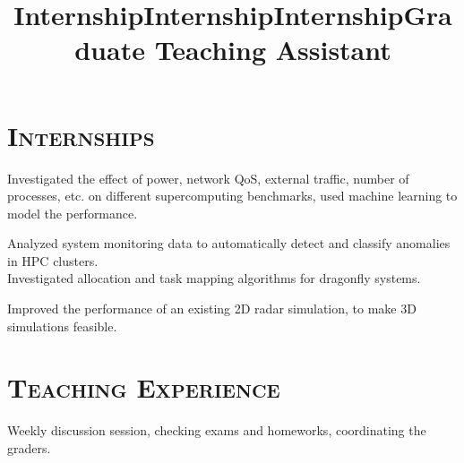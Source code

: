 \begin{resume}
	\section{\textsc{Internships}}
	
	\title{Internship}
	\begin{position}
    Investigated the effect of power, network QoS, external traffic, number of
    processes, etc. on different supercomputing benchmarks, used machine
    learning to model the performance.
	\end{position}
	
	\title{Internship}
	\begin{position}
		Analyzed system monitoring data to automatically detect and classify
    anomalies in HPC clusters. \\
    Investigated allocation and task mapping algorithms for dragonfly systems.
	\end{position}
	
	\title{Internship}
	\begin{position}
		Improved the performance of an existing 2D radar simulation, to make 3D
    simulations feasible.
	\end{position}
	
	
	\section{\textsc{Teaching Experience}}
	
	\title{Graduate Teaching Assistant}
	\begin{position}
		Weekly discussion session, checking exams and homeworks, coordinating the
    graders.  
	\end{position}
	

\end{resume}
